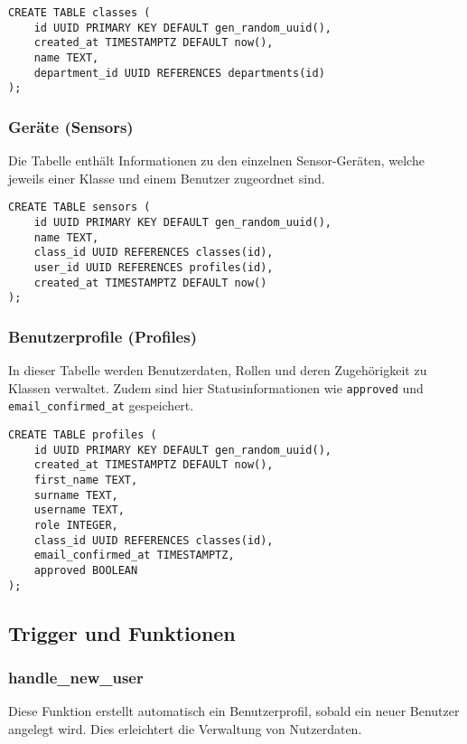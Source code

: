 \begin{inhalt}
\begin{lstlisting}[style=mysql]
CREATE TABLE classes (
    id UUID PRIMARY KEY DEFAULT gen_random_uuid(),
    created_at TIMESTAMPTZ DEFAULT now(),
    name TEXT,
    department_id UUID REFERENCES departments(id)
);
\end{lstlisting}

\subsubsection{Geräte (Sensors)}
Die Tabelle enthält Informationen zu den einzelnen Sensor-Geräten, welche jeweils einer Klasse und einem Benutzer zugeordnet sind.

\begin{lstlisting}[style=mysql]
CREATE TABLE sensors (
    id UUID PRIMARY KEY DEFAULT gen_random_uuid(),
    name TEXT,
    class_id UUID REFERENCES classes(id),
    user_id UUID REFERENCES profiles(id),
    created_at TIMESTAMPTZ DEFAULT now()
);
\end{lstlisting}

\subsubsection{Benutzerprofile (Profiles)}
In dieser Tabelle werden Benutzerdaten, Rollen und deren Zugehörigkeit zu Klassen verwaltet. Zudem sind hier Statusinformationen wie \texttt{approved} und \texttt{email\_confirmed\_at} gespeichert.

\begin{lstlisting}[style=mysql]
CREATE TABLE profiles (
    id UUID PRIMARY KEY DEFAULT gen_random_uuid(),
    created_at TIMESTAMPTZ DEFAULT now(),
    first_name TEXT,
    surname TEXT,
    username TEXT,
    role INTEGER,
    class_id UUID REFERENCES classes(id),
    email_confirmed_at TIMESTAMPTZ,
    approved BOOLEAN
);
\end{lstlisting}

\subsection{Trigger und Funktionen}

\subsubsection{handle\_new\_user}
Diese Funktion erstellt automatisch ein Benutzerprofil, sobald ein neuer Benutzer angelegt wird. Dies erleichtert die Verwaltung von Nutzerdaten.


\end{inhalt}
